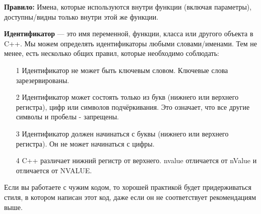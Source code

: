 \documentclass[a4paper,16pt]{report} %
\begin{document}
\textbf{Правило:} Имена, которые используются внутри функции (включая
параметры), доступны/видны только внутри этой же функции.

\textbf{Идентификатор} — это имя переменной, функции, класса или другого объекта в C++. Мы можем определять идентификаторы любыми словами/именами. Тем не менее, есть несколько общих правил, которые необходимо соблюдать:

\begin{itemize}
	\item[1]Идентификатор не может быть ключевым словом. Ключевые слова зарезервированы.
	\item[2]Идентификатор может состоять только из букв (нижнего или верхнего регистра), цифр или символов подчёркивания. Это означает, что все другие символы и пробелы - запрещены.
	\item[3]Идентификатор должен начинаться с буквы (нижнего или верхнего регистра). Он не может начинаться с цифры.
	\item[4]C++ различает нижний регистр от верхнего. nvalue отличается от nValue и отличается от NVALUE.
\end{itemize}

Если вы работаете с чужим кодом, то хорошей практикой будет придерживаться стиля, в котором написан этот код, даже если он не соответствует рекомендациям выше.
\end{document}
